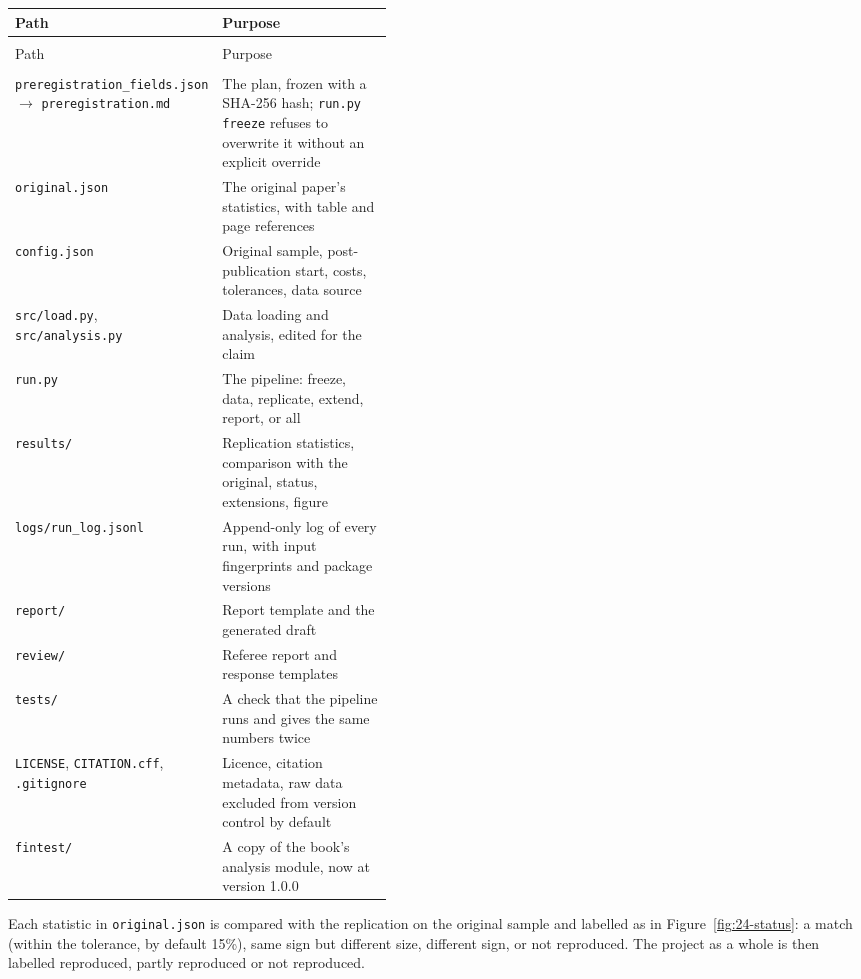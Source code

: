 \begingroup
\small
\setlength{\LTpre}{6pt}\setlength{\LTpost}{6pt}
\begin{longtable}{@{}>{\raggedright\arraybackslash}p{0.44\linewidth}>{\raggedright\arraybackslash}p{}@{}}
\toprule
Path & Purpose \\
\midrule
\endfirsthead
\multicolumn{2}{@{}l}{\emph{(continued)}} \\
\toprule
Path & Purpose \\
\midrule
\endhead
\midrule
\multicolumn{2}{r@{}}{\emph{(continued on the next page)}} \\
\endfoot
\bottomrule
\endlastfoot
\texttt{preregistration\_fields.json} $\rightarrow$ \texttt{preregistration.md} & The plan, frozen with a SHA-256 hash; \texttt{run.py freeze} refuses to overwrite it without an explicit override \\
\texttt{original.json} & The original paper's statistics, with table and page references \\
\texttt{config.json} & Original sample, post-publication start, costs, tolerances, data source \\
\texttt{src/load.py}, \texttt{src/analysis.py} & Data loading and analysis, edited for the claim \\
\texttt{run.py} & The pipeline: freeze, data, replicate, extend, report, or all \\
\texttt{results/} & Replication statistics, comparison with the original, status, extensions, figure \\
\texttt{logs/run\_log.jsonl} & Append-only log of every run, with input fingerprints and package versions \\
\texttt{report/} & Report template and the generated draft \\
\texttt{review/} & Referee report and response templates \\
\texttt{tests/} & A check that the pipeline runs and gives the same numbers twice \\
\texttt{LICENSE}, \texttt{CITATION.cff}, \texttt{.gitignore} & Licence, citation metadata, raw data excluded from version control by default \\
\texttt{fintest/} & A copy of the book's analysis module, now at version 1.0.0 \\
\end{longtable}
\addtocounter{table}{-1}%
\endgroup

Each statistic in \texttt{original.json} is compared with the replication on the original sample and labelled as in Figure~\ref{fig:24-status}: a match (within the tolerance, by default 15\%), same sign but different size, different sign, or not reproduced. The project as a whole is then labelled reproduced, partly reproduced or not reproduced.

